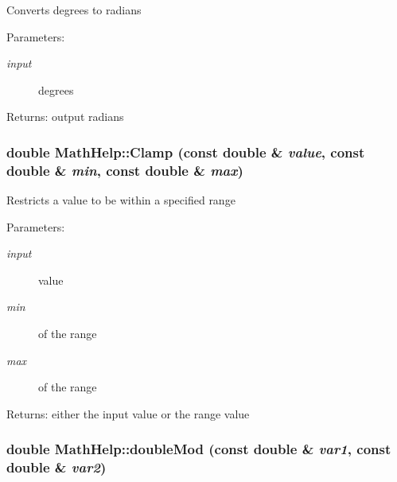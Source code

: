 Converts degrees to radians \begin{Desc}
\item[Parameters:]
\begin{description}
\item[{\em input}]degrees \end{description}
\end{Desc}
\begin{Desc}
\item[Returns:]output radians \end{Desc}
\hypertarget{class_math_help_7a9a497d7adc9bd092e169640b2d2eb2}{
\subsubsection[Clamp]{\setlength{\rightskip}{0pt plus 5cm}double MathHelp::Clamp (const double \& {\em value}, \/  const double \& {\em min}, \/  const double \& {\em max})}}
\label{class_math_help_7a9a497d7adc9bd092e169640b2d2eb2}


Restricts a value to be within a specified range \begin{Desc}
\item[Parameters:]
\begin{description}
\item[{\em input}]value \item[{\em min}]of the range \item[{\em max}]of the range \end{description}
\end{Desc}
\begin{Desc}
\item[Returns:]either the input value or the range value \end{Desc}
\hypertarget{class_math_help_b6bb2a6e426ce4c8971a54a061034f63}{
\subsubsection[doubleMod]{\setlength{\rightskip}{0pt plus 5cm}double MathHelp::doubleMod (const double \& {\em var1}, \/  const double \& {\em var2})}}
\label{class_math_help_b6bb2a6e426ce4c8971a54a061034f63}


